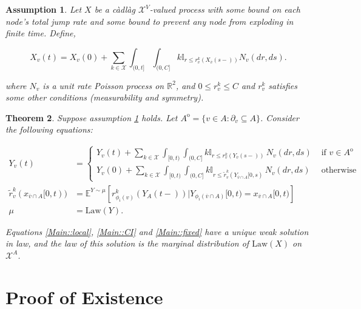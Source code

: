 \documentclass[12pt]{article}
\newcommand{\mb}{\mathbb}
\newcommand{\mc}{\mathcal}
\newcommand{\ov}{\overline}
\newcommand{\te}{\text}
\newcommand{\exmu}[2]{\mb{E}^{#1}\left[#2\right]}	%
\newcommand{\Xf}{X}									%
\newcommand{\vcomp}[1]{_{#1}}						%
\newcommand{\tme}[1]{(#1)}							%
\newcommand{\tmi}[1]{#1}							%
\newcommand{\stte}{\mc{X}}							%
\newcommand{\poiss}{N}								%
\newcommand{\poissv}[1]{_{#1}}						%
\newcommand{\neigh}[1]{\partial_{#1}}
\newcommand{\cl}[1]{\ov{#1}}
\newcommand{\intA}{A^\mathrm{o}}
\newcommand{\Xg}{Y}
\newcommand{\alt}[1]{\tilde{#1}}
\newcommand{\law}{\te{Law}}
\newtheorem{thms}{Theorem}[section]
\newtheorem{assu}[thms]{Assumption}
\begin{document}
\begin{assu}
Let \(\Xf\) be a c\`adl\`ag \(\stte^V\)-valued process with some bound on each node's total jump rate and some bound to prevent any node from exploding in finite time. Define,

\begin{equation}
\Xf\vcomp{v}\tme{t} = \Xf\vcomp{v}\tme{0} + \sum_{k \in \stte}\int_{(0,t]}\int_{(0,C]} k\mb{I}_{r\leq r_v^k(\Xf\vcomp{\cl{v}}\tme{s-})} \poiss\poissv{v}(dr,ds).
\label{Main::full}
\end{equation}

where \(\poiss\poissv{v}\) is a unit rate Poisson process on \(\mb{R}^2\), and \(0 \leq r_v^k \leq C\) and \(r_v^k\) satisfies some other conditions (measurability and symmetry).
\label{Main::Xassu}
\end{assu}


\begin{thms}
Suppose assumption \ref{Main::Xassu} holds. Let \(\intA = \{v \in A: \neigh{v} \subseteq A\}\). Consider the following equations:

\begin{align}
\Xg\vcomp{v}\tme{t} &= 
\begin{cases}
\Xg\vcomp{v}\tme{t} + \sum_{k \in \stte} \int_{[0,t)}\int_{(0,C]} k\mb{I}_{r\leq r^k_v(\Xg\vcomp{\cl{v}}\tme{s-})}\,\poiss\poissv{v}(dr,ds) & \te{ if } v \in \intA\\
\Xg\vcomp{v}\tme{0} + \sum_{k \in \stte} \int_{[0,t)}\int_{(0,C]} k\mb{I}_{r\leq \alt{r}^k_v(\Xg\vcomp{\cl{v}\cap A}\tmi{[0,s)}}\,\poiss\poissv{v}(dr,ds) &\te{ otherwise}
\end{cases}\label{Main::local}\\
\alt{r}^k_v(x_{\cl{v}\cap A}[0,t)) &= \exmu{\Xg \sim \mu}{r^k_{\phi_i(v)}(\Xg\vcomp{A}\tme{t-})|\Xg\vcomp{\phi_i(\cl{v}\cap A)}\tmi{[0,t)} = x\vcomp{\cl{v}\cap A}\tmi{[0,t)}}\label{Main::CI}\\
\mu &= \law(\Xg).\label{Main::fixed}
\end{align}

Equations \eqref{Main::local}, \eqref{Main::CI} and \eqref{Main::fixed} have a unique weak solution in law, and the law of this solution is the marginal distribution of \(\law(\Xf)\) on \(\stte^A\).
\end{thms}

\section{Proof of Existence}
\label{Ex}
\end{document}
